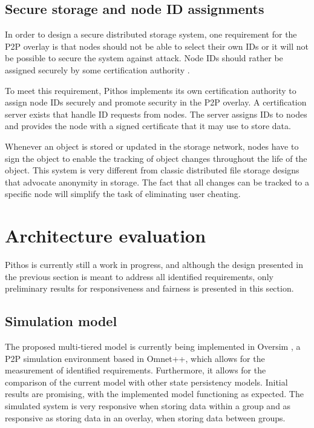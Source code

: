 \documentclass[10pt,a4paper,conference]{IEEEtran}
\begin{document}
\subsection{Secure storage and node ID assignments}
\label{secure_ids}

In order to design a secure distributed storage system, one requirement for the P2P overlay is that nodes should not be able to select their own IDs
or it will not be possible to secure the system against attack. Node IDs should rather be assigned securely by some certification authority
\cite{secure_overlay_routing}.

To meet this requirement, Pithos implements its own certification authority to assign node IDs securely and promote security in the P2P overlay. A
certification server exists that handle ID requests from nodes. The server assigns IDs to nodes and provides the node with a signed certificate that
it may use to store data.

Whenever an object is stored or updated in the storage network, nodes have to sign the object to enable the tracking of object changes throughout the
life of the object. This system is very different from classic distributed file storage designs that advocate anonymity in storage. The fact that all
changes can be tracked to a specific node will simplify the task of eliminating user cheating.

\section{Architecture evaluation}
\label{evaluation}

Pithos is currently still a work in progress, and although the design presented in the previous section is meant to address all identified
requirements, only preliminary results for responsiveness and fairness is presented in this section.

\subsection{Simulation model}
\label{test_setup}

The proposed multi-tiered model is currently being implemented in Oversim \cite{OverSim_2007}, a P2P simulation environment based in Omnet++, which
allows for the measurement of identified requirements. Furthermore, it allows for the comparison of the current model with other state persistency
models. Initial results are promising, with the implemented model functioning as expected. The simulated system is very responsive when storing data
within a group and as responsive as storing data in an overlay, when storing data between groups.
\end{document}
